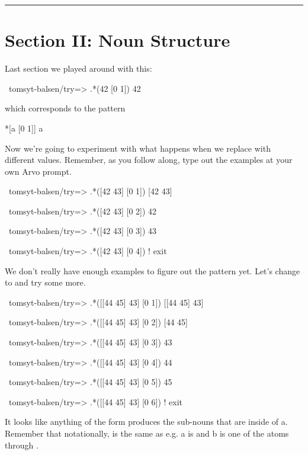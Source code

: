 \begin{center}
\rule{3in}{0.4pt}
\end{center}

\section{Section II: Noun Structure}

Last section we played around with this:

\begin{code}
~tomsyt-balsen/try=> .*(42 [0 1])
42
\end{code}
which corresponds to the pattern
\begin{code}
*[a [0 1]]                  a
\end{code}

Now we're going to experiment with what happens when we replace  with
different values. Remember, as you follow along, type out the examples at your
own Arvo prompt.
\begin{code}
~tomsyt-balsen/try=> .*([42 43] [0 1])
[42 43]

~tomsyt-balsen/try=> .*([42 43] [0 2])
42

~tomsyt-balsen/try=> .*([42 43] [0 3])
43

~tomsyt-balsen/try=> .*([42 43] [0 4])
! exit
\end{code}

We don't really have enough examples to figure out the pattern yet. Let's
change \kode{[42 43]} to \kode{[[44 45] 43]} and try some more.
\begin{code}
~tomsyt-balsen/try=> .*([[44 45] 43] [0 1])
[[44 45] 43] 

~tomsyt-balsen/try=> .*([[44 45] 43] [0 2])
[44 45]

~tomsyt-balsen/try=> .*([[44 45] 43] [0 3])
43

~tomsyt-balsen/try=> .*([[44 45] 43] [0 4])
44

~tomsyt-balsen/try=> .*([[44 45] 43] [0 5])
45

~tomsyt-balsen/try=> .*([[44 45] 43] [0 6])
! exit
\end{code}

It looks like anything of the form \kode{*[a [0 b]]} produces the sub-nouns that are
inside of a. Remember that notationally, \kode{*[a [0 b]]} is the same as  e.g. a is \kode{[[44 45] 43]} and b is one of the atoms  through . 

